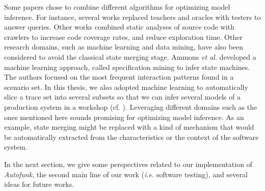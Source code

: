 Some papers chose to combine different algorithms for optimizing
model inference. For instance, several works
\cite{Alur:2005:SIS:1047659.1040314,Raffelt:2005:LLA:1081180.1081189,ngll11}
replaced teachers and oracles with testers to answer queries.
Other works \cite{Azim13,WPX13} combined static analyses of
source code with crawlers to increase code coverage rates, and
reduce exploration time. Other  research domains, such as machine
learning and data mining, have also been considered to avoid the
classical state merging stage. Ammons \emph{et al.}
\cite{Ammons:2002:MS:565816.503275} developed a machine learning
approach, called specification mining to infer state machines.
The authors focused on the most frequent interaction patterns
found in a scenario set. In this thesis, we also adopted machine
learning to automatically slice a trace set into several subsets
so that we can infer several models of a production system in a
workshop (cf.
).
Leveraging different domains such as the ones mentioned here
sounds promising for optimizing model inference. As an example,
state merging might be replaced with a kind of mechanism that
would be automatically extracted from the characteristics or the
context of the software system.

In the next section, we give some perspectives related to our
implementation of \emph{Autofunk}, the second main line of our
work (\emph{i.e.} software testing), and several ideas for future
works.
